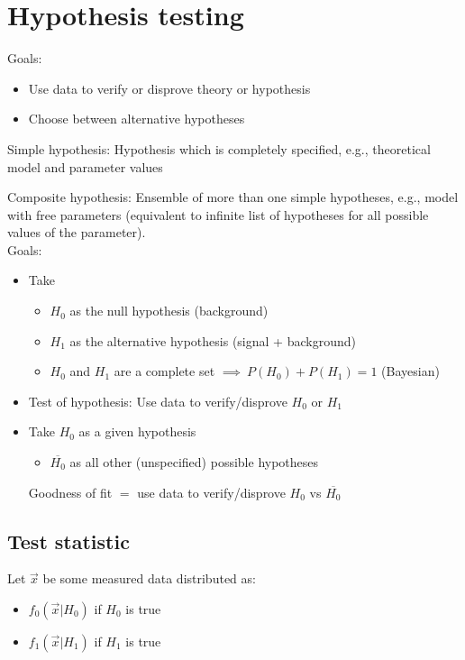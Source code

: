 \section{Hypothesis testing} \label{hypothesis_testing}
Goals: \begin{itemize}[$\to$]
    \item Use data to verify or disprove theory or hypothesis
    \item Choose between alternative hypotheses 
\end{itemize}

Simple hypothesis: Hypothesis which is completely specified, e.g., theoretical model and parameter values 

Composite hypothesis: Ensemble of more than one simple hypotheses, e.g., model with free parameters (equivalent to infinite list of hypotheses for all possible values of the parameter).\\


Goals: 
\begin{itemize}[$\to$]
    \item Take 
    \begin{itemize}[$\to$]
        \item $H_0$ as the null hypothesis (background)
        \item $H_1$ as the alternative hypothesis (signal + background)
        \item $H_0$ and $H_1$ are a complete set $\implies \: P(H_0)+P(H_1) = 1$ (Bayesian) 
    \end{itemize}
    \item Test of hypothesis: Use data to verify/disprove $H_0$ or $H_1$
    \item Take $H_0$ as a given hypothesis
      \begin{itemize}
          \item $\overline{H_0}$ as all other (unspecified) possible hypotheses
      \end{itemize}
      Goodness of fit $=$ use data to verify/disprove $H_0$ vs $\overline{H_0}$
\end{itemize}

\subsection{Test statistic}
Let $\vec{x}$ be some measured data distributed as: 
\begin{itemize}[$\to$]
  \item $f_0(\vec{x}|H_0)$ if $H_0$ is true 
  \item $f_1(\vec{x}|H_1)$ if $H_1$ is true
\end{itemize}

